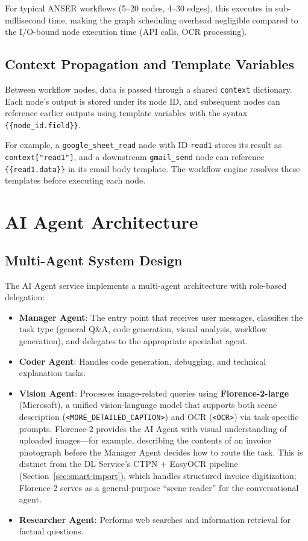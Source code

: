\documentclass[11pt,a4paper]{report}
\begin{document}
For typical ANSER workflows (5--20 nodes, 4--30 edges), this executes in sub-millisecond time, making the graph scheduling overhead negligible compared to the I/O-bound node execution time (API calls, OCR processing).

\subsection{Context Propagation and Template Variables}

Between workflow nodes, data is passed through a shared \texttt{context} dictionary. Each node's output is stored under its node ID, and subsequent nodes can reference earlier outputs using template variables with the syntax \texttt{\{\{node\_id.field\}\}}.

For example, a \texttt{google\_sheet\_read} node with ID \texttt{read1} stores its result as \texttt{context["read1"]}, and a downstream \texttt{gmail\_send} node can reference \texttt{\{\{read1.data\}\}} in its email body template. The workflow engine resolves these templates before executing each node.

\section{AI Agent Architecture}
\label{sec:ai-agent}

\subsection{Multi-Agent System Design}

The AI Agent service implements a multi-agent architecture with role-based delegation:

\begin{itemize}
  \item \textbf{Manager Agent}: The entry point that receives user messages, classifies the task type (general Q\&A, code generation, visual analysis, workflow generation), and delegates to the appropriate specialist agent.
  \item \textbf{Coder Agent}: Handles code generation, debugging, and technical explanation tasks.
  \item \textbf{Vision Agent}: Processes image-related queries using \textbf{Florence-2-large} (Microsoft), a unified vision-language model that supports both scene description (\texttt{<MORE\_DETAILED\_CAPTION>}) and OCR (\texttt{<OCR>}) via task-specific prompts. Florence-2 provides the AI Agent with visual understanding of uploaded images---for example, describing the contents of an invoice photograph before the Manager Agent decides how to route the task. This is distinct from the DL Service's CTPN + EasyOCR pipeline (Section~\ref{sec:smart-import}), which handles structured invoice digitization; Florence-2 serves as a general-purpose ``scene reader'' for the conversational agent.
  \item \textbf{Researcher Agent}: Performs web searches and information retrieval for factual questions.
\end{itemize}
\end{document}
